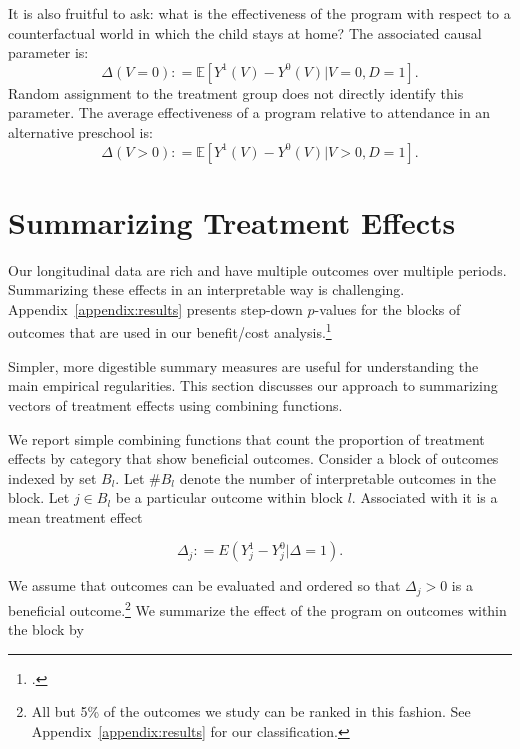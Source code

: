 It is also fruitful to ask: what is the effectiveness of the program with respect to a counterfactual world in which the child stays at home? The associated causal parameter is:
\begin{equation}\label{eq:influenza}
\Delta \left(V = 0 \right) : =   \mathbb{E} \left[ Y^1 \left( V \right) - Y^0 \left( V \right) | V = 0, D = 1 \right].
\end{equation}
Random assignment to the treatment group does not directly identify this parameter. The average effectiveness of a program relative to attendance in an alternative preschool is:
\begin{equation}\label{eq:smallpox}
\Delta \left( V > 0 \right) : =   \mathbb{E} \left[ Y^1 \left(V \right) - Y^0 \left( V \right) | V > 0, D = 1 \right].
\end{equation}

\section{Summarizing Treatment Effects} \label{section:methodology}

Our longitudinal data are rich and have multiple outcomes over multiple periods. Summarizing these effects in an interpretable way is challenging. Appendix~\ref{appendix:results} presents step-down $p$-values for the blocks of outcomes that are used in our benefit/cost analysis.\footnote{\citet{Lehman_Romano_2005_AnnStat,Romano_Shaikh_2006_AnnStat}.}

Simpler, more digestible summary measures are useful for understanding the main empirical regularities. This section discusses our approach to summarizing vectors of treatment effects using combining functions.

We report simple combining functions that count the proportion of treatment effects by category that show beneficial outcomes. Consider a block of outcomes indexed by set $B_l$. Let $\# B_l$ denote the number of interpretable outcomes in the block. Let $j \in B_l$ be a particular outcome within block $l$. Associated with it is a mean treatment effect

\begin{equation}
\Delta_j : = E(Y^1_j - Y^0_j | \Delta=1).
\end{equation}

We assume that outcomes can be evaluated and ordered so that $\Delta_j >0$ is a beneficial outcome.\footnote{All but 5\% of the outcomes we study can be ranked in this fashion. See Appendix~\ref{appendix:results} for our classification.} We summarize the effect of the program on outcomes within the block by

